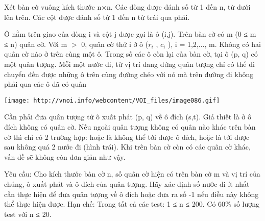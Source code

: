 Xét bàn cờ vuông kích thước n×n. Các dòng được đánh số từ 1 đến n, từ dưới lên trên. Các cột được đánh số từ 1 đến n từ trái qua phải.

Ô nằm trên giao của dòng i và cột j được gọi là ô (i,j). Trên bàn cờ có m (0 ≤ m ≤ n) quân cờ. Với m $>$ 0, quân cờ thứ i ở ô ($r_{i}$ , $c_{i}$ ), i = 1,2,..., m. Không có hai quân cờ nào ở trên cùng một ô. Trong số các ô còn lại của bàn cờ, tại ô (p, q) có một quân tượng. Mỗi một nước đi, từ vị trí đang đứng quân tượng chỉ có thể di chuyển đến được những ô trên cùng đường chéo với nó mà trên đường đi không phải qua các ô đã có quân


\texttt{[image: http://vnoi.info/webcontent/VOI\_files/image086.gif]}

Cần phải đưa quân tượng từ ô xuất phát (p, q) về ô đích (s,t). Giả thiết là ở ô đích không có quân cờ. Nếu ngoài quân tượng không có quân nào khác trên bàn cờ thì chỉ có 2 trường hợp: hoặc là không thể tới được ô đích, hoặc là tới được sau không quá 2 nước đi (hình trái). Khi trên bàn cờ còn có các quân cờ khác, vấn đề sẽ không còn đơn giản như vậy.

Yêu cầu: Cho kích thước bàn cờ n, số quân cờ hiện có trên bàn cờ m và vị trí của chúng, ô xuất phát và ô đích của quân tượng. Hãy xác định số nước đi ít nhất cần thực hiện để đưa quân tượng về ô đích hoặc đưa ra số -1 nếu điều này không thể thực hiện được.
Hạn chế:
Trong tất cả các test: 1 ≤ n ≤ 200. Có 60\% số lượng test với n ≤ 20.